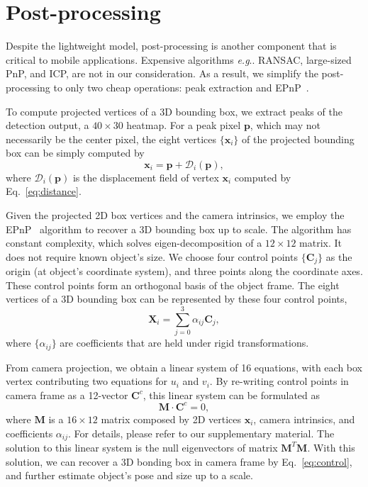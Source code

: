 \documentclass[runningheads]{llncs}
\makeatletter
\DeclareRobustCommand\onedot{\futurelet\@let@token\@onedot}
\def\@onedot{\ifx\@let@token.\else.\null\fi\xspace}
\def\eg{\emph{e.g}\onedot} \def\Eg{\emph{E.g}\onedot}
\makeatother
\begin{document}
\section{Post-processing}\label{sec:post}
Despite the lightweight model, post-processing is another component that is critical to mobile applications. Expensive algorithms \eg RANSAC, large-sized PnP, and ICP, are not in our consideration. As a result, we simplify the post-processing to only two cheap operations: peak extraction and EPnP~\cite{Lepetit_2009_EPnP}.

To compute projected vertices of a 3D bounding box, we extract peaks of the detection output, a $40\times30$ heatmap. For a peak pixel $\mathbf{p}$, which may not necessarily be the center pixel, the eight vertices $\{\mathbf{x}_i\}$ of the projected bounding box can be simply computed by
\begin{equation}
 \mathbf{x}_i = \mathbf{p} + \mathcal{D}_i(\mathbf{p}), 
\end{equation}
where $\mathcal{D}_i(\mathbf{p})$ is the displacement field of vertex $\mathbf{x}_i$ computed by Eq.~\ref{eq:distance}.

Given the projected 2D box vertices and the camera intrinsics, we employ the EPnP~\cite{Lepetit_2009_EPnP} algorithm to recover a 3D bounding box up to scale. The algorithm has constant complexity, which solves eigen-decomposition of a $12\times12$ matrix. It does not require known object's size. We choose four control points $\{\mathbf{C}_j\}$ as the origin (at object's coordinate system), and three points along the coordinate axes. These control points form an orthogonal basis of the object frame. The eight vertices of a 3D bounding box can be represented by these four control points,
\begin{equation}\label{eq:control}
\mathbf{X}_i=\sum_{j=0}^{3}\alpha_{ij}\mathbf{C}_j,
\end{equation}
where $\{\alpha_{ij}\}$ are coefficients that are held under rigid transformations.

From camera projection, we obtain a linear system of 16 equations, with each box vertex contributing two equations for $u_i$ and $v_i$. By re-writing control points in camera frame as a 12-vector $\mathbf{C}^c$, this linear system can be formulated as
\begin{equation}
\mathbf{M}\cdot\mathbf{C}^c=0,
\end{equation}
where $\mathbf{M}$ is a $16\times12$ matrix composed by 2D vertices $\mathbf{x}_i$, camera intrinsics, and coefficients $\alpha_{ij}$. For details, please refer to our supplementary material. The solution to this linear system is the null eigenvectors of matrix $\mathbf{M}^T\mathbf{M}$. With this solution, we can recover a 3D bonding box in camera frame by Eq.~\ref{eq:control}, and further estimate object's pose and size up to a scale. 
\end{document}
